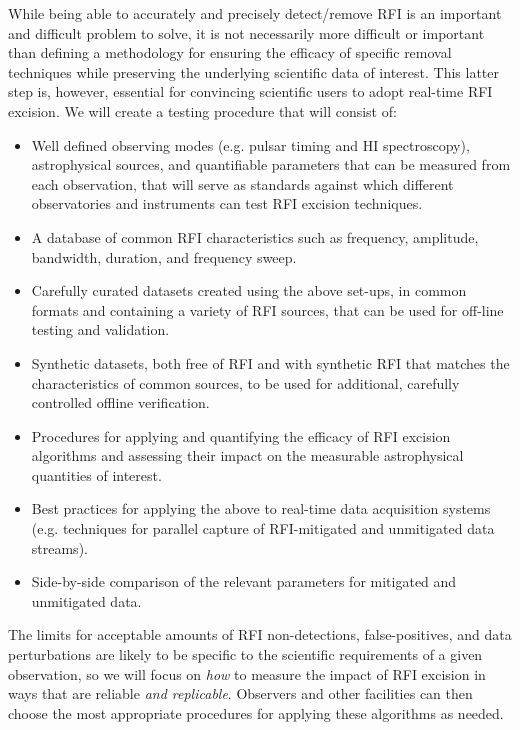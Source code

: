 \documentclass[10pt]{myNSF}
\begin{document}
While being able to accurately and precisely detect/remove RFI is an
important and difficult problem to solve, it is not necessarily more
difficult or important than defining a methodology for ensuring the
efficacy of specific removal techniques while preserving the
underlying scientific data of interest.  This latter step is, however,
essential for convincing scientific users to adopt real-time RFI
excision.  We will create a testing procedure that will consist of:
\begin{itemize}
\item{Well defined observing modes (e.g. pulsar timing and H{\sc I}
  spectroscopy), astrophysical sources, and quantifiable parameters
  that can be measured from each observation, that will serve as
  standards against which different observatories and instruments can
  test RFI excision techniques.}
\item{A database of common RFI characteristics such as frequency,
  amplitude, bandwidth, duration, and frequency sweep.}
\item{Carefully curated datasets created using the above set-ups, in
  common formats and containing a variety of RFI sources, that can be
  used for off-line testing and validation.}
\item{Synthetic datasets, both free of RFI and with synthetic RFI that
    matches the characteristics of common sources, to be used for
    additional, carefully controlled offline verification.}
\item{Procedures for applying and quantifying the efficacy of RFI
  excision algorithms and assessing their impact on the measurable
  astrophysical quantities of interest.}
\item{Best practices for applying the above to real-time data
  acquisition systems (e.g. techniques for parallel capture of
  RFI-mitigated and unmitigated data streams).}
\item{Side-by-side comparison of the relevant parameters for mitigated
  and unmitigated data.}
\end{itemize}

The limits for acceptable amounts of RFI non-detections,
false-positives, and data perturbations are likely to be specific to
the scientific requirements of a given observation, so we will focus
on \emph{how} to measure the impact of RFI excision in ways that are
reliable \emph{and replicable}.  Observers and other facilities can
then choose the most appropriate procedures for applying these
algorithms as needed.
\end{document}
